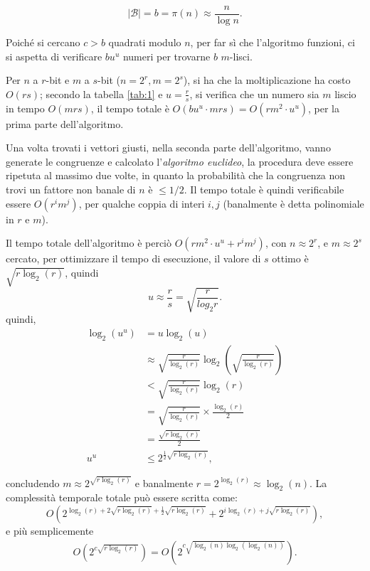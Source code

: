 \[
    |\mathcal{B}| = b = \pi(n) \approx \frac{n}{\log n}.
\]

Poiché si cercano $c > b$ quadrati modulo $n$, per far sì che l'algoritmo funzioni, ci si aspetta di verificare $bu^u$ numeri per trovarne $b$ $m$-lisci. 

Per $n$ a $r$-bit e $m$ a $s$-bit ($n = 2^r, m=2^s$), si ha che la moltiplicazione ha costo $O(rs)$; secondo la tabella \ref{tab:1} e $u = \frac{r}{s}$, si verifica che un numero sia $m$ liscio in tempo $O(mrs)$, il tempo totale è $O(bu^u \cdot mrs) = O(rm^2 \cdot u^u)$, per la prima parte dell'algoritmo.

Una volta trovati i vettori giusti, nella seconda parte dell'algoritmo, vanno generate le congruenze e calcolato l'\textit{algoritmo euclideo}, la procedura deve essere ripetuta al massimo due volte, in quanto la probabilità che la congruenza non trovi un fattore non banale di $n$ è $\leq 1/2$. Il tempo totale è quindi verificabile essere $O(r^i m^j)$, per qualche coppia di interi $i,j$ (banalmente è detta polinomiale in $r$ e $m$). 

\vspace{1em}
Il tempo totale dell'algoritmo è perciò $O(rm^2 \cdot u^u + r^i m^j)$, con $n \approx 2^r$, e $m \approx 2^s$ cercato, per ottimizzare il tempo di esecuzione, il valore di $s$ ottimo è $ \sqrt{r \log_2(r)}$, quindi 
\[
    u \approx \frac{r}{s} = \sqrt{\frac{r}{log_2 r}}.
\]
quindi, 
\begin{align*}
    \log_2(u^u) &= u \log_2(u)\\
    &\approx  \sqrt{\frac{r}{\log_2(r)}}\log_2\left(\sqrt{\frac{r}{\log_2(r)}}\right)\\
    &< \sqrt{\frac{r}{\log_2(r)}}\log_2(r)\\
    &= \sqrt{\frac{r}{\log_2(r)}} \times \frac{\log_2(r)}{2}\\
    &= \frac{\sqrt{r \log_2(r)}}{2}\\
    u^u &\leq 2^{\frac{1}{2}\sqrt{r\log_2(r)}},
\end{align*}

\noindent
concludendo $m \approx 2^{\sqrt{r\log_2(r)}}$ e banalmente $r = 2^{\log_2(r)} \approx \log_2(n)$.
La complessità temporale totale può essere scritta come:
\[
    O\left( 2^{\log_2(r) + 2\sqrt{r\log_2(r)} + \frac{1}{2} \sqrt{r \log_2(r)}} + 2^{i\log_2(r) + j \sqrt{r\log_2(r)}}\right),
\]
e più semplicemente
\begin{gather*}
    O\left( 2^{c \sqrt{r \log_2(r)}}\right) = O\left( 2^{c \sqrt{\log_2(n)\log_2(\log_2(n))}}\right).
\end{gather*}

